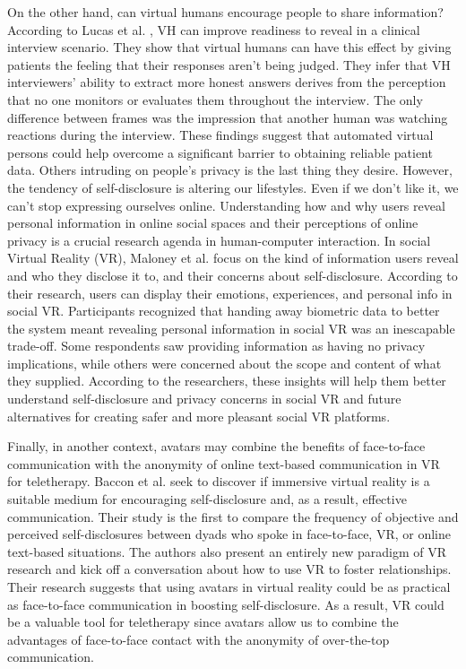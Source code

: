 On the other hand, can virtual humans encourage people to share information? According to Lucas et al. \cite{LUC14}, VH can improve readiness to reveal in a clinical interview scenario. They show that virtual humans can have this effect by giving patients the feeling that their responses aren't being judged. They infer that VH interviewers' ability to extract more honest answers derives from the perception that no one monitors or evaluates them throughout the interview. The only difference between frames was the impression that another human was watching reactions during the interview. These findings suggest that automated virtual persons could help overcome a significant barrier to obtaining reliable patient data. Others intruding on people's privacy is the last thing they desire. However, the tendency of self-disclosure is altering our lifestyles. Even if we don't like it, we can't stop expressing ourselves online. Understanding how and why users reveal personal information in online social spaces and their perceptions of online privacy is a crucial research agenda in human-computer interaction. In social Virtual Reality (VR), Maloney et al. \cite{MAL20} focus on the kind of information users reveal and who they disclose it to, and their concerns about self-disclosure. According to their research, users can display their emotions, experiences, and personal info in social VR. Participants recognized that handing away biometric data to better the system meant revealing personal information in social VR was an inescapable trade-off. Some respondents saw providing information as having no privacy implications, while others were concerned about the scope and content of what they supplied. According to the researchers, these insights will help them better understand self-disclosure and privacy concerns in social VR and future alternatives for creating safer and more pleasant social VR platforms.

Finally, in another context, avatars may combine the benefits of face-to-face communication with the anonymity of online text-based communication in VR for teletherapy. Baccon et al. \cite{BAC19} seek to discover if immersive virtual reality is a suitable medium for encouraging self-disclosure and, as a result, effective communication. Their study is the first to compare the frequency of objective and perceived self-disclosures between dyads who spoke in face-to-face, VR, or online text-based situations. The authors also present an entirely new paradigm of VR research and kick off a conversation about how to use VR to foster relationships. Their research suggests that using avatars in virtual reality could be as practical as face-to-face communication in boosting self-disclosure. As a result, VR could be a valuable tool for teletherapy since avatars allow us to combine the advantages of face-to-face contact with the anonymity of over-the-top communication.

